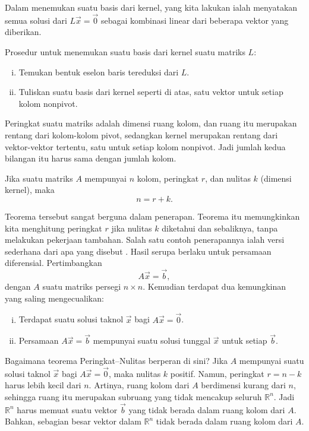 Dalam menemukan suatu basis dari kernel, yang kita lakukan ialah menyatakan semua
solusi dari
$L \vec{x} = \vec{0}$ sebagai kombinasi linear dari beberapa vektor yang diberikan.

\pagebreak[2]
Prosedur untuk menemukan suatu basis dari kernel suatu matriks $L$:
\begin{enumerate}[(i)]
\item Temukan bentuk eselon baris tereduksi dari $L$.
\item Tuliskan suatu basis dari kernel seperti di atas, satu vektor untuk setiap
kolom nonpivot.
\end{enumerate}


Peringkat suatu matriks adalah dimensi ruang kolom, dan ruang itu
merupakan rentang dari kolom-kolom pivot, sedangkan kernel merupakan rentang dari vektor-vektor tertentu,
satu untuk setiap kolom nonpivot. Jadi jumlah kedua bilangan itu harus sama dengan jumlah
kolom.

\begin{theorem}
Jika suatu matriks $A$ mempunyai $n$ kolom, peringkat $r$, dan nulitas $k$ (dimensi
kernel), maka
\begin{equation*}
n = r+k .
\end{equation*}
\end{theorem}

Teorema tersebut sangat berguna dalam penerapan. Teorema itu memungkinkan kita menghitung
peringkat $r$ jika nulitas $k$ diketahui dan sebaliknya, tanpa melakukan
pekerjaan tambahan.
Salah satu contoh penerapannya ialah versi sederhana dari apa yang disebut
\emph{}. Hasil serupa berlaku untuk
persamaan diferensial. Pertimbangkan
\begin{equation*}
A \vec{x} = \vec{b} ,
\end{equation*}
dengan $A$ suatu matriks persegi $n \times n$.
Kemudian terdapat dua kemungkinan yang saling mengecualikan:
\begin{enumerate}[(i)]
\item
Terdapat suatu solusi taknol $\vec{x}$ bagi $A \vec{x} = \vec{0}$.
\item
Persamaan $A \vec{x} = \vec{b}$ mempunyai suatu solusi tunggal $\vec{x}$ untuk setiap
$\vec{b}$.
\end{enumerate}
Bagaimana teorema Peringkat--Nulitas berperan di sini? Jika $A$ mempunyai
suatu solusi taknol $\vec{x}$ bagi $A \vec{x} = \vec{0}$, maka nulitas $k$
positif. Namun, peringkat $r = n-k$ harus lebih kecil dari $n$.
Artinya, ruang kolom dari $A$ berdimensi kurang dari $n$, sehingga ruang itu
merupakan subruang yang tidak mencakup seluruh ${\mathbb{R}}^n$.
Jadi ${\mathbb{R}}^n$ harus
memuat suatu vektor $\vec{b}$ yang tidak berada dalam ruang kolom dari $A$. Bahkan, sebagian besar
vektor dalam ${\mathbb{R}}^n$ tidak berada dalam ruang kolom dari $A$.



